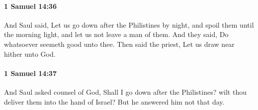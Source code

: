 		\paragraph{1 Samuel 14:36} %
			\label{1SAMUEL-14-36}

			And Saul said, Let us go down after the Philistines by night, and spoil them until the morning light, and let us not leave a man of them. And they said, Do whatsoever seemeth good unto thee. Then said the priest, Let us draw near hither unto God.


		\paragraph{1 Samuel 14:37} %
			\label{1SAMUEL-14-37}

			And Saul asked counsel of God, Shall I go down after the Philistines? wilt thou deliver them into the hand of Israel? But he answered him not that day.

